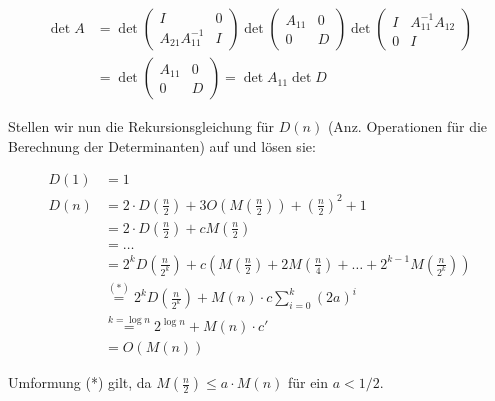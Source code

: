 \documentclass[11pt,a4paper,ngerman]{article}
\begin{document}
\begin{equation*}\begin{split}
\det A &= \det \left( \begin{array}{cc}
          I & 0 \\
          A_{21}A_{11}^{-1} & I
          \end{array} \right)
          \det \left( \begin{array}{cc}
          A_{11} & 0 \\
          0 & D
          \end{array} \right)
          \det \left( \begin{array}{cc}
          I & A_{11}^{-1}A_{12} \\
          0 & I
          \end{array} \right) \\
      &= \det \left( \begin{array}{cc}
          A_{11} & 0 \\
          0 & D
          \end{array} \right)
       = \det A_{11} \det D
\end{split}\end{equation*}

Stellen wir nun die Rekursionsgleichung für $D(n)$ (Anz. Operationen für die Berechnung der Determinanten) auf und lösen sie:

\begin{equation*}\begin{split}
D(1) &= 1 \\
D(n) &= 2\cdot D\left(\frac{n}{2}\right) + 3O\left(M\left(\frac{n}{2}\right) \right) + \left(\frac{n}{2}\right)^2 + 1 \\
     &= 2\cdot D\left(\frac{n}{2}\right) + c M\left(\frac{n}{2}\right) \\
     &= \ldots \\
     &= 2^k D\left(\frac{n}{2^k} \right) + c \left(M\left(\frac{n}{2}\right)+ 2M\left(\frac{n}{4}\right) + \ldots +  2^{k-1}M\left(\frac{n}{2^k}\right) \right) \\
     &\stackrel{(*)}{=} 2^k D\left(\frac{n}{2^k} \right) + M(n) \cdot c\sum_{i=0}^{k} {(2a)^i} \\
     &\stackrel{k = \log n}{=}2^{\log n} + M(n) \cdot c' \\
     &= O(M(n))
\end{split}\end{equation*}

Umformung (*) gilt, da $M(\frac{n}{2}) \leq a\cdot M(n)$ für ein $a < 1/2$.
\end{document}
